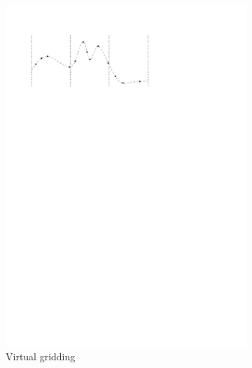 \begin{figure}
\centering
  \begin{subfigure}[b]{0.3\linewidth}
    \centering
    \includegraphics[width=\textwidth,page=2]{figs/virtualgridding.pdf}
    \caption{Virtual gridding}\label{fig:fr:vg:a}
  \end{subfigure}
  \qquad
  \begin{subfigure}[b]{0.3\linewidth}
    \centering

\end{subfigure}
\end{figure}
